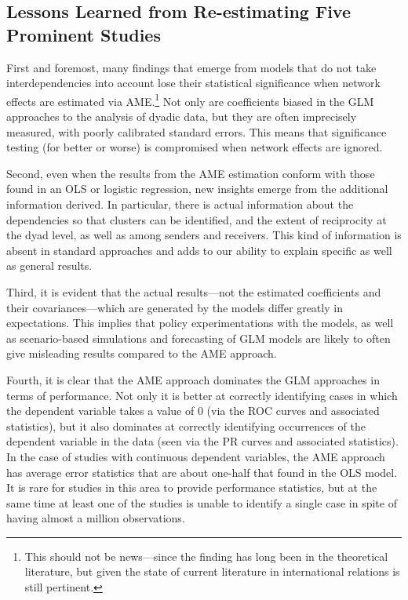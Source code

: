 \subsection{Lessons Learned from Re-estimating Five Prominent Studies}

First and foremost, many findings that emerge from models that do not take interdependencies into account lose their statistical significance when network effects are estimated via AME.\footnote{This should not be news---since the finding has long been in the theoretical literature, but given the state of current literature in international relations is still pertinent.} Not only are coefficients biased in the GLM approaches to the analysis of dyadic data, but they are often imprecisely measured, with poorly calibrated standard errors.  This means that significance testing (for better or worse) is compromised when network effects are ignored.

Second, even when the results from the AME estimation conform with those found in an OLS or logistic regression, new insights emerge from the additional information derived. In particular, there is actual information about the dependencies so that clusters can be identified, and the extent of reciprocity at the dyad level, as well as among senders and receivers.  This kind of information is absent in standard approaches and adds to our ability to explain specific as well as general results.

Third, it is evident that the actual results---not the estimated coefficients and their covariances---which are generated by the models differ greatly in expectations.  This implies that policy experimentations with the models, as well as scenario-based simulations and forecasting of GLM models are likely to often give misleading results compared to the AME approach.

Fourth, it is clear that the AME approach dominates the GLM approaches in terms of performance. Not only it is better at correctly identifying cases in which the dependent variable takes a value of $0$ (via the ROC curves and associated statistics), but it also dominates at correctly identifying occurrences of the dependent variable in the data (seen via the PR curves and associated statistics).  In the case of studies with continuous dependent variables, the AME approach has average error statistics that are about one-half that found in the OLS model. It is rare for studies in this area to provide performance statistics, but at the same time at least one of the studies is unable to identify a single case in spite of having almost a million observations.

